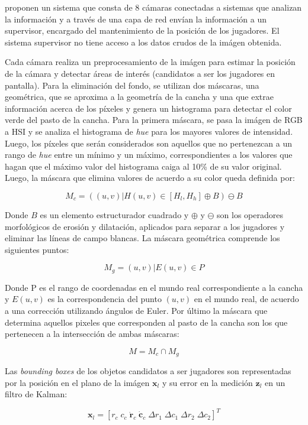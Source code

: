 \documentclass[a4paper,10pt]{article}
\begin{document}
\citeauthor*{xu-8cams} proponen un sistema que consta de 8 cámaras conectadas a sistemas que 
analizan la información y a través de una capa de red envían la información a un supervisor,
encargado del mantenimiento de la posición de los jugadores. El sistema supervisor no tiene 
acceso a los datos crudos de la imágen obtenida.

Cada cámara realiza un preprocesamiento de la imágen para estimar la posición de la cámara y
detectar áreas de interés (candidatos a ser los jugadores en pantalla). Para la eliminación
del fondo, se utilizan dos máscaras, una geométrica, que se aproxima a la geometría de la
cancha y una que extrae información acerca de los píxeles y genera un histograma para
detectar el color verde del pasto de la cancha. Para la primera máscara, se pasa la imágen de
RGB a HSI y se analiza el histograma de \textit{hue} para los mayores valores de intensidad.
Luego, los píxeles que serán considerados son aquellos que no pertenezcan a un rango de \textit{hue}
entre un mínimo y un máximo, correspondientes a los valores que hagan que el máximo valor
del histograma caiga al 10\% de su valor original.  Luego, la máscara que elimina valores
de acuerdo a su color queda definida por:

\[
  M_c = ({(u, v) | H(u, v) \in [H_l, H_h]} \oplus B ) \ominus B
\]

Donde $B$ es un elemento estructurador cuadrado y $\oplus$ y $\ominus$ son los operadores
morfológicos de erosión y dilatación, aplicados para separar a los jugadores y eliminar las
líneas de campo blancas. La máscara geométrica comprende los siguientes puntos:

\[
  M_g = { (u, v) | E(u, v)  \in P }
\]

Donde P es el rango de coordenadas en el mundo real correspondiente a la cancha y $E(u, v)$ es 
la correspondencia del punto $(u, v)$ en el mundo real, de acuerdo a una corrección utilizando
ángulos de Euler. Por último la máscara que determina aquellos pixeles que corresponden al
pasto de la cancha son los que pertenecen a la intersección de ambas máscaras:

\[
  M = M_c \cap M_g
\]

Las \textit{bounding boxes} de los objetos candidatos a ser jugadores son representadas por
la posición en el plano de la imágen $\mathbf{x}_l$ y su error en la medición $\mathbf{z}_l$ en
un filtro de Kalman:

\[
\mathbf{x}_l = [r_c \; c_c \;  \mathbf{\dot r}_c  \; \mathbf{\dot c}_c \;  \Delta r_1  \; \Delta c_1 \;  \Delta r_2 \;  \Delta c_2]^T
\]
\end{document}
